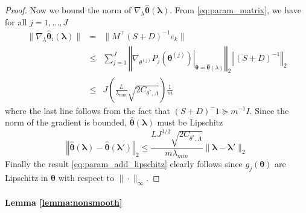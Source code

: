 \documentclass[12pt]{article}
\begin{document}
\begin{proof}
	Now we bound the norm of $\nabla_\lambda \hat{\boldsymbol{\theta}}(\boldsymbol{\lambda})$. From \eqref{eq:param_matrix}, we have for all $j=1,...,J$
	\begin{eqnarray*}
		\|\nabla_{\lambda}\hat{\boldsymbol{\theta}}_{i}(\boldsymbol{\lambda})\| & = & \|M^{\top}\left(S+D\right)^{-1}e_{k}\|\\
		& \le & \sum_{j=1}^{J}\left\Vert \left.\nabla_{\theta^{(j)}}P_{j}(\boldsymbol{\theta}^{(j)})\right|_{\boldsymbol{\theta}=\hat{\boldsymbol{\theta}}(\lambda)}\right\Vert _{2}\left\Vert \left(S+D\right)^{-1}\right\Vert _{2}\\
		& \le & J\left(\frac{L}{\lambda_{min}}\sqrt{2C_{\theta^{*},\Lambda}}\right)\frac{1}{m}
	\end{eqnarray*}
	where the last line follows from the fact that $(S + D)^-1 \succeq m^{-1}I$. Since the norm of the gradient is bounded, $\hat{\boldsymbol{\theta}}(\boldsymbol{\lambda})$ must be Lipschitz
	\begin{equation}
	\left\Vert \hat{\boldsymbol{\theta}}(\boldsymbol{\lambda})-\hat{\boldsymbol{\theta}}(\boldsymbol{\lambda}')\right\Vert _{2}\le\frac{LJ^{3/2}\sqrt{2C_{\theta^{*},\Lambda}}}{m\lambda_{min}}\|\boldsymbol{\lambda}-\boldsymbol{\lambda}'\|_{2}
	\end{equation}
	Finally the result \eqref{eq:param_add_lipschitz} clearly follows since $g_j(\boldsymbol{\theta})$ are Lipschitz in $\boldsymbol{\theta}$ with respect to $\| \cdot \|_\infty$.
\end{proof}

\paragraph{Lemma \ref{lemma:nonsmooth}}
\end{document}
